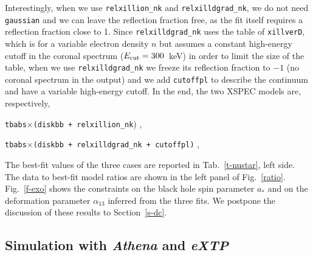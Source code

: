 \documentclass[twocolumn]{emulateapj}
\begin{document}
Interestingly, when we use {\tt relxillion\_nk} and {\tt relxilldgrad\_nk}, we do not need {\tt gaussian} and we can leave the reflection fraction free, as the fit itself requires a reflection fraction close to 1. Since {\tt relxilldgrad\_nk} uses the table of {\tt xillverD}, which is for a variable electron density $n$ but assumes a constant high-energy cutoff in the coronal spectrum ($E_{\rm cut} = 300$~keV) in order to limit the size of the table, when we use {\tt relxilldgrad\_nk} we freeze its reflection fraction to $-1$ (no coronal spectrum in the output) and we add {\tt cutoffpl} to describe the continuum and have a variable high-energy cutoff. In the end, the two XSPEC models are, respectively,

\vspace{0.2cm}

{\tt tbabs$\times$(diskbb + relxillion\_nk}) ,

\vspace{0.2cm}

{\tt tbabs$\times$(diskbb + relxilldgrad\_nk + cutoffpl)} ,

\vspace{0.2cm}

The best-fit values of the three cases are reported in Tab.~\ref{t-nustar}, left side. The data to best-fit model ratios are shown in the left panel of Fig.~\ref{ratio}. Fig.~\ref{f-exo} shows the constraints on the black hole spin parameter $a_*$ and on the deformation parameter $\alpha_{13}$ inferred from the three fits. We postpone the discussion of these results to Section~\ref{s-dc}.





\subsection{Simulation with \textsl{Athena} and \textsl{eXTP}}
\end{document}

